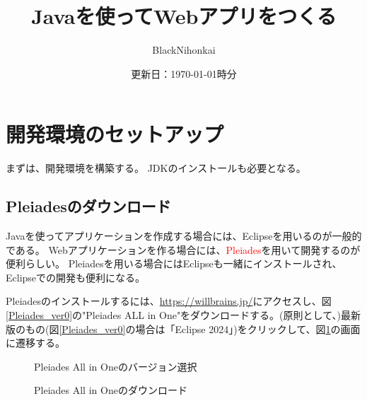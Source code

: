 \documentclass[a4paper,10pt]{jsarticle}
\title{Javaを使ってWebアプリをつくる}
\author{BlackNihonkai}
\date{更新日：\today  \the\hour 時\the\minute 分}
\begin{document}
\maketitle



\section{開発環境のセットアップ}
  まずは、開発環境を構築する。
  JDKのインストールも必要となる。

  \subsection{Pleiadesのダウンロード}
    Javaを使ってアプリケーションを作成する場合には、Eclipseを用いるのが一般的である。
    Webアプリケーションを作る場合には、\textcolor{red}{Pleiades}を用いて開発するのが便利らしい。
    Pleiadesを用いる場合にはEclipseも一緒にインストールされ、Eclipseでの開発も便利になる。
    
    Pleiadesのインストールするには、\url{https://willbrains.jp/}にアクセスし、図\ref{Pleiades_ver0}の"Pleiades ALL in One"をダウンロードする。(原則として、)最新版のもの(図\ref{Pleiades_ver0}の場合は「Eclipse 2024」)をクリックして、図\ref{Pleiades_DL}の画面に遷移する。

    
    \begin{figure}[H]
      \centering
      \begin{minipage}[b]{0.49\columnwidth}
        \centering
        \caption{Pleiades All in Oneのバージョン選択}
        \label{Pleiades_ver0}
      \end{minipage}
      \begin{minipage}[b]{0.49\columnwidth}
        \center
        \caption{Pleiades All in Oneのダウンロード}
        \label{Pleiades_DL}
      \end{minipage}
    \end{figure}
\end{document}
